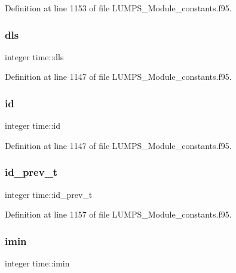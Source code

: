 Definition at line 1153 of file L\+U\+M\+P\+S\+\_\+\+Module\+\_\+constants.\+f95.

\mbox{\label{namespacetime_a0985b09f5d79535bd56787cb3c82cfd0}} 
\subsubsection{\texorpdfstring{dls}{dls}}
{\footnotesize\ttfamily integer time\+::dls}



Definition at line 1147 of file L\+U\+M\+P\+S\+\_\+\+Module\+\_\+constants.\+f95.

\mbox{\label{namespacetime_abc3475e9770d0639f41dad7382bcb6d0}} 
\subsubsection{\texorpdfstring{id}{id}}
{\footnotesize\ttfamily integer time\+::id}



Definition at line 1147 of file L\+U\+M\+P\+S\+\_\+\+Module\+\_\+constants.\+f95.

\mbox{\label{namespacetime_a12b68236a1014f7a9cee2fac8b4aa5f0}} 
\subsubsection{\texorpdfstring{id\+\_\+prev\+\_\+t}{id\_prev\_t}}
{\footnotesize\ttfamily integer time\+::id\+\_\+prev\+\_\+t}



Definition at line 1157 of file L\+U\+M\+P\+S\+\_\+\+Module\+\_\+constants.\+f95.

\mbox{\label{namespacetime_a9be08cae4e706325fe3524f4370754cc}} 
\subsubsection{\texorpdfstring{imin}{imin}}
{\footnotesize\ttfamily integer time\+::imin}



